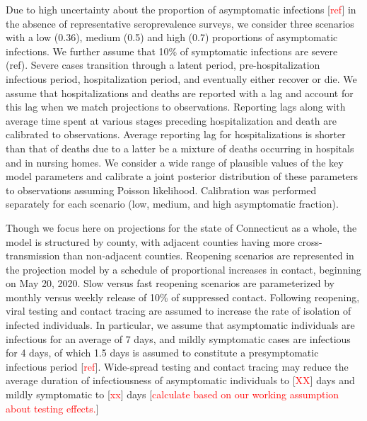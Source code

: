 \documentclass[11pt]{article}
\newcommand{\comment}[1]{[\textcolor{red}{#1}]}
\begin{document}
Due to high uncertainty about the proportion of asymptomatic infections \comment{ref} in the absence of representative seroprevalence surveys, we consider three scenarios with a low (0.36), medium (0.5) and high (0.7) proportions of asymptomatic infections. We further assume that 10\% of symptomatic infections are severe (ref). Severe cases transition through a latent period, pre-hospitalization infectious period, hospitalization period, and eventually either recover or die. We assume that hospitalizations and deaths are reported with a lag and account for this lag when we match projections to observations. Reporting lags along with average time spent at various stages preceding hospitalization and death are calibrated to observations. Average reporting lag for hospitalizations is shorter than that of deaths due to a latter be a mixture of deaths occurring in hospitals and in nursing homes.  We consider a wide range of plausible values of the key model parameters and calibrate a joint posterior distribution of these parameters to observations assuming Poisson likelihood. Calibration was performed separately for each scenario (low, medium, and high asymptomatic fraction).

Though we focus here on projections for the state of Connecticut as a whole, the model is structured by county, with adjacent counties having more cross-transmission than non-adjacent counties.  Reopening scenarios are represented in the projection model by a schedule of proportional increases in contact, beginning on May 20, 2020. Slow versus fast reopening scenarios are parameterized by monthly versus weekly release of 10\% of suppressed contact. 
Following reopening, viral testing and contact tracing are assumed to increase the rate of isolation of infected individuals. In particular, we assume that asymptomatic individuals are infectious for an average of 7 days, and mildly symptomatic cases are infectious for 4 days, of which 1.5 days is assumed to constitute a presymptomatic infectious period \comment{ref}. Wide-spread testing and contact tracing may reduce the average duration of infectiousness of asymptomatic individuals to \comment{XX} days and mildly symptomatic to \comment{xx} days \comment{calculate based on our working assumption about testing effects.}

\end{document}
